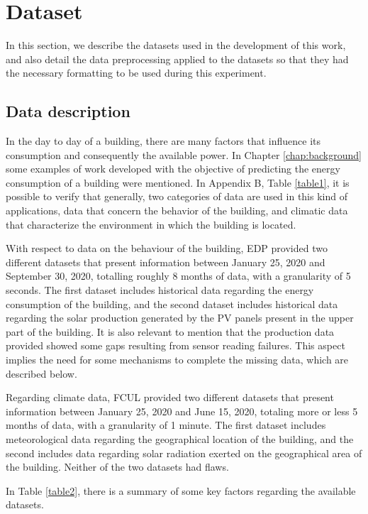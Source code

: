\section{Dataset}\label{chap5:dataset}

In this section, we describe the datasets used in the development of this work, and also detail the data preprocessing applied to the datasets so that they had the necessary formatting to be used during this experiment.

\subsection{Data description}

In the day to day of a building, there are many factors that influence its consumption and consequently the available power. In Chapter \ref{chap:background} some examples of work developed with the objective of predicting the energy consumption of a building were mentioned. In Appendix B, Table \ref{table1}, it is possible to verify that generally, two categories of data are used in this kind of applications, data that concern the behavior of the building, and climatic data that characterize the environment in which the building is located.

With respect to data on the behaviour of the building, \ac{EDP} provided two different datasets that present information between January 25, 2020 and September 30, 2020, totalling roughly 8 months of data, with a granularity of 5 seconds. The first dataset includes historical data regarding the energy consumption of the building, and the second dataset includes historical data regarding the solar production generated by the \ac{PV} panels present in the upper part of the building. It is also relevant to mention that the production data provided showed some gaps resulting from sensor reading failures. This aspect implies the need for some mechanisms to complete the missing data, which are described below.

Regarding climate data, \ac{FCUL} provided two different datasets that present information between January 25, 2020 and June 15, 2020, totaling more or less 5 months of data, with a granularity of 1 minute. The first dataset includes meteorological data regarding the geographical location of the building, and the second includes data regarding solar radiation exerted on the geographical area of the building. Neither of the two datasets had flaws.

In Table \ref{table2}, there is a summary of some key factors regarding the available datasets.


